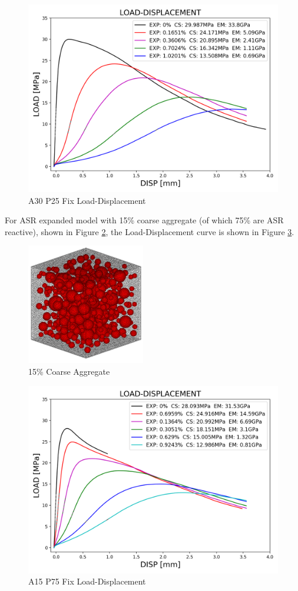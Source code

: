 \begin{figure}[ht]
\centering
\includegraphics[width=.8\linewidth]{Files/exp_3D/ASR/S13A30P25FIX-LOAD-DISPLACEMENT.png}
  \caption{A30 P25 Fix Load-Displacement}
  \label{fig:A30P25FIX_LD}
\end{figure}

\clearpage

For ASR expanded model with 15\% coarse aggregate (of which 75\% are ASR reactive), shown in Figure \ref{fig:A15P75_model}, the Load-Displacement curve is shown in Figure \ref{fig:A15P75FIX_LD}.


\begin{figure}[ht]
\centering
\includegraphics[width=.3\linewidth]{Files/Aggregate/A15.png}
  \caption{15\% Coarse Aggregate}
  \label{fig:A15P75_model}
\end{figure}

\begin{figure}[ht]
\centering
\includegraphics[width=.8\linewidth]{Files/exp_3D/ASR/S13A15P75FIX-LOAD-DISPLACEMENT.png}
  \caption{A15 P75 Fix Load-Displacement}
  \label{fig:A15P75FIX_LD}
\end{figure}

